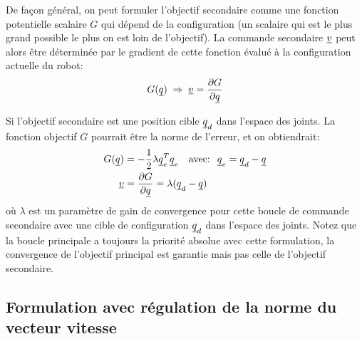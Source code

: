
De façon général, on peut formuler l'objectif secondaire comme une fonction potentielle scalaire $G$ qui dépend de la configuration (un scalaire qui est le plus grand possible le plus on est loin de l'objectif). La commande secondaire $\underline{v}$ peut alors être déterminée par le gradient de cette fonction évalué à la configuration actuelle du robot:
\begin{align}
G( \underline{q} ) \; \Rightarrow \; \underline{v} = \frac{\partial G }{\partial \underline{q} }
\end{align}

Si l'objectif secondaire est une position cible $\underline{q}_d$ dans l'espace des joints. La fonction objectif $G$ pourrait être la norme de l'erreur, et on obtiendrait:
\begin{align}
G( \col{q} ) &= - \frac{1}{2} \lambda \col{q}_e^T \col{q}_e
\quad \text{avec: } \; \col{q}_e = \col{q}_d - \col{q} \\
\col{v} &= \frac{\partial G }{\partial \col{q} } = \lambda \huge( \col{q}_d - \col{q} \huge)
\end{align}
où $\lambda$ est un paramètre de gain de convergence pour cette boucle de commande secondaire avec une cible de configuration $\underline{q}_d$ dans l'espace des joints. Notez que la boucle principale a toujours la priorité absolue avec cette formulation, la convergence de l'objectif principal est garantie mais pas celle de l'objectif secondaire. 



\subsection{Formulation avec régulation de la norme du vecteur vitesse}

